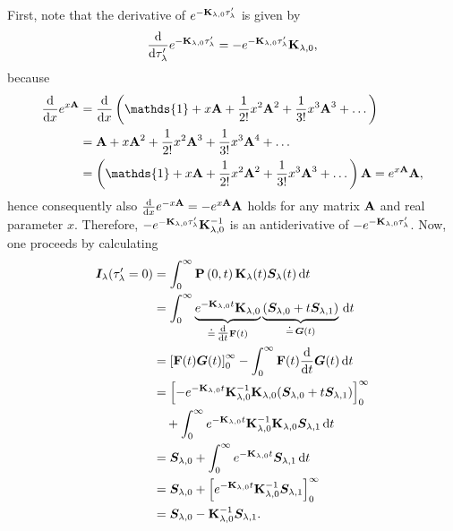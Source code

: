 \documentclass[a4paper,11pt]{report}
\begin{document}
First, note that the derivative of $e^{-\boldsymbol{\mathbf{K}}_{\lambda,0}\tau_\lambda^\prime}$ is given by \begin{equation}
\frac{\mathrm{d}}{\mathrm{d}\tau_\lambda^\prime}e^{-\boldsymbol{\mathbf{K}}_{\lambda,0}\tau_\lambda^\prime} = -e^{-\boldsymbol{\mathbf{K}}_{\lambda,0}\tau_\lambda^\prime}\boldsymbol{\mathbf{K}}_{\lambda,0},
\end{equation} because \begin{align}
\begin{aligned}
\frac{\mathrm{d}}{\mathrm{d}x}e^{x\matr{A}} &= \frac{\mathrm{d}}{\mathrm{d}x}\left(\mathds{1} + x\matr{A} + \frac{1}{2!}x^2\matr{A}^2 + \frac{1}{3!}x^3\matr{A}^3 + \dots \right) \\
&= \matr{A} + x\matr{A}^2 + \frac{1}{2!}x^2\matr{A}^3 +  \frac{1}{3!}x^3\matr{A}^4 + \dots \\
&= \left(\mathds{1} + x\matr{A} + \frac{1}{2!}x^2\matr{A}^2 +  \frac{1}{3!}x^3\matr{A}^3 + \dots\right)\matr{A} = e^{x\matr{A}}\matr{A},
\end{aligned}
\end{align} hence consequently also $\frac{\mathrm{d}}{\mathrm{d}x}e^{-x\boldsymbol{\mathbf{A}}} = -e^{x\boldsymbol{\mathbf{A}}}\boldsymbol{\mathbf{A}}$ holds for any matrix $\boldsymbol{\mathbf{A}}$ and real parameter $x$. Therefore, $-e^{-\boldsymbol{\mathbf{K}}_{\lambda,0}\tau_\lambda^\prime}\boldsymbol{\mathbf{K}}_{\lambda,0}^{-1}$ is an antiderivative of $-e^{-\boldsymbol{\mathbf{K}}_{\lambda,0}\tau_\lambda^\prime}$. Now, one proceeds by calculating \begin{align}
\begin{aligned}\label{eq:fundamentalMEsolution}
\vect{I}_\lambda(\tau_\lambda^\prime = 0) &= \int_{0}^{ \infty}\matr{P}\left(0,t\right)\matr{K}_\lambda(t)\vect{S}_\lambda(t)\,\mathrm{d}t \\ &= \int_{0}^{\infty}\underbrace{e^{-\matr{K}_{\lambda,0}t}\matr{K}_{\lambda,0}}_{\doteq\,\tfrac{\mathrm{d}}{\mathrm{d}t}\matr{F}(t)}\underbrace{\left(\vect{S}_{\lambda,0}+t\vect{S}_{\lambda,1}\right)}_{\doteq\,\vect{G}(t)}\,\mathrm{d}t \\
&= \left[\matr{F}(t)\vect{G}(t)\right]^{\infty}_{0} - \int_{0}^{\infty} \matr{F}(t)\frac{\mathrm{d}}{\mathrm{d}t}\vect{G}(t)\,\mathrm{d}t \\
&= \left[-e^{-\matr{K}_{\lambda,0}t}\matr{K}_{\lambda,0}^{-1}\matr{K}_{\lambda,0}(\vect{S}_{\lambda,0}+t\vect{S}_{\lambda,1})\right]^{\infty}_{0} \\ &\quad + \int_{0}^{\infty}e^{-\matr{K}_{\lambda,0}t}\matr{K}_{\lambda,0}^{-1}\matr{K}_{\lambda,0}\vect{S}_{\lambda,1}\,\mathrm{d}t \\
&= \vect{S}_{\lambda,0} + \int_{0}^{\infty}e^{-\matr{K}_{\lambda,0}t}\vect{S}_{\lambda,1}\,\mathrm{d}t \\ &= \vect{S}_{\lambda,0} + \left[e^{-\matr{K}_{\lambda,0}t}\matr{K}_{\lambda,0}^{-1}\vect{S}_{\lambda,1}\right]^{\infty}_0 \\ &= \vect{S}_{\lambda,0}-\matr{K}_{\lambda,0}^{-1}\vect{S}_{\lambda,1}.

\end{aligned}
\end{align}
\end{document}
